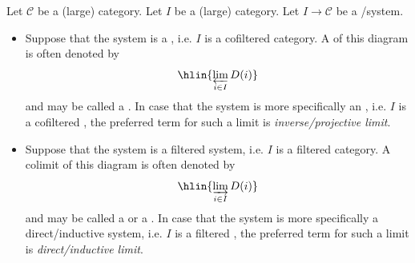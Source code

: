 
\begin{definition} \label{definition:projective_and_inductive_limits_in_categories}
Let $\mathcal{C}$ be a (large) category. Let $I$ be a (large) category. Let $I \to \mathcal{C}$ be a /system. 
\begin{itemize}
    \item Suppose that the system is a , i.e. $I$ is a cofiltered category. A  of this diagram is often denoted by 
    $$\hlin{ \varprojlim_{i\in I} D(i) }$$
    and may be called a . In case that the system is more specifically an , i.e. $I$ is a cofiltered , the preferred term for such a limit is \emph{inverse/projective limit}.

    \item Suppose that the system is a filtered system, i.e. $I$ is a filtered category. A colimit of this diagram is often denoted by 
    $$\hlin{ \varinjlim_{i\in I} D(i) }$$
    and may be called a  or a . In case that the system is more specifically a direct/inductive system, i.e. $I$ is a filtered , the preferred term for such a limit is \emph{direct/inductive limit}.

\end{itemize}
\end{definition}

